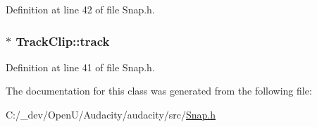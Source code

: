 Definition at line 42 of file Snap.\+h.

\subsubsection[{\texorpdfstring{track}{track}}]{$\ast$ Track\+Clip\+::track}\hypertarget{class_track_clip_a3539d37f715d74f8400bbede3be13c6a}{}\label{class_track_clip_a3539d37f715d74f8400bbede3be13c6a}


Definition at line 41 of file Snap.\+h.



The documentation for this class was generated from the following file\+:\begin{DoxyCompactItemize}
\item 
C\+:/\+\_\+dev/\+Open\+U/\+Audacity/audacity/src/\hyperlink{_snap_8h}{Snap.\+h}\end{DoxyCompactItemize}
